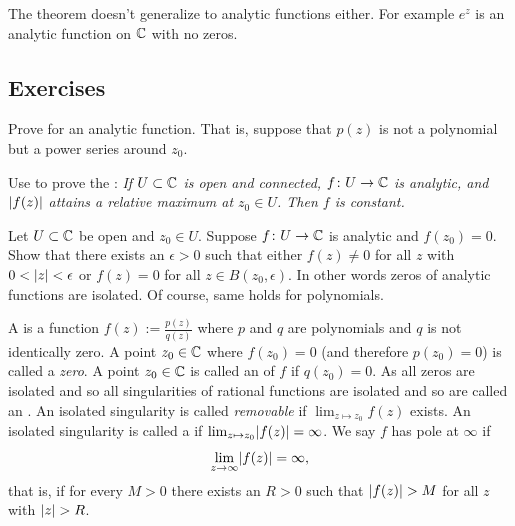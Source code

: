 The theorem doesn't generalize to analytic functions either.  For example
$e^{z}$ is an analytic function on ${\mathbb{C}}$ with no zeros.

\subsection{Exercises}

\begin{exercise} \label{exercise:minprinciple}
Prove  for an analytic function.  That
is, suppose that $p(z)$ is not a polynomial but a power series around $z_0$.
\end{exercise}

\begin{exercise}
Use  to prove the \emph{}: \emph{If $U \subset {\mathbb{C}}$ is open and connected,
$f \colon U \to {\mathbb{C}}$ is analytic, and $\lvert {f(z)} \rvert$ attains a relative
maximum at $z_0 \in U$.  Then $f$ is constant.}
\end{exercise}

\begin{exercise}
Let $U \subset {\mathbb{C}}$ be open and $z_0 \in U$.
Suppose $f \colon U \to {\mathbb{C}}$ is analytic and $f(z_0) = 0$.  Show that
there exists an $\epsilon > 0$ such that either
$f(z) \not= 0$ for all $z$ with $0 < \lvert {z} \rvert < \epsilon$
or $f(z) = 0$ for all $z \in B(z_0,\epsilon)$.
In other words zeros of analytic functions are isolated.
Of course, same holds for polynomials.
\end{exercise}

\pagebreak[1]
\begin{exnote}
A \emph{} is a function
$f(z) := \frac{p(z)}{q(z)}$
where $p$ and $q$ are polynomials and $q$ is not identically zero.
A point $z_0 \in {\mathbb{C}}$ where $f(z_0) = 0$ (and therefore $p(z_0) = 0$)
is called a \emph{zero}.
A point $z_0 \in {\mathbb{C}}$ is called an \emph{} of
$f$ if $q(z_0) = 0$.  As all zeros are isolated and so
all singularities of rational functions are isolated
and so are called
an \emph{}.
An isolated singularity is called
\emph{removable}
if $\lim_{z \mapsto z_0} f(z)$ exists.
An isolated singularity is called a \emph{} if 
$\lim_{z \mapsto z_0} \lvert {f(z)} \rvert = \infty$.
We say $f$ has pole at $\infty$ if
\begin{equation*}
\lim_{z \to \infty} \lvert {f(z)} \rvert = \infty ,
\end{equation*}
that is, if for every $M > 0$ there exists an $R > 0$ such that
$\lvert {f(z)} \rvert > M$ for all $z$ with $\lvert {z} \rvert > R$.
\end{exnote}

